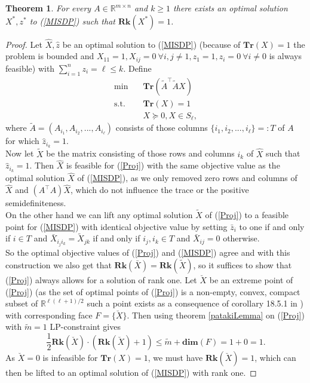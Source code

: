 \documentclass{elsarticle}
\newtheorem{thm}{Theorem}
\newcommand{\T}{^{\top}}
\newcommand{\R}{\mathds{R}}
\begin{document}
\begin{thm}\label{Rk1thm}
 For every $A \in \R^{m \times n}$ and $k \geq 1$ there exists an optimal solution $X^*, z^*$ to (\ref{MISDP}) such that $\textbf{Rk}(X^*) = 1$. 
\end{thm}
\begin{proof}
 Let $\hat{X}, \hat{z}$ be an optimal solution to (\ref{MISDP}) (because of $\textbf{Tr}(X) = 1$ the problem is bounded and $X_{11} = 1, X_{ij} = 0 \ \forall i,j \neq 1, z_1 = 1, z_i = 0 \ \forall i \neq 0$ is always feasible)
 with $\sum_{i=1}^n z_i = \ell \leq k$. Define
 \begin{align}\label{Proj}
 \text{min} \quad & \textbf{Tr}(\tilde{A}\T\tilde{A}X) \nonumber \\
 \text{s.t.} \quad & \textbf{Tr}(X) = 1 \tag{Proj} \\
 & X \succeq 0 , X \in S_\ell, \nonumber
 \end{align}
where $\tilde{A} = (A_{i_1}, A_{i_2}, ..., A_{i_\ell})$ consists of those columns $\{{i_1}, {i_2}, ..., {i_\ell}\} =: T$ of $A$ for which $\hat{z}_{i_k} = 1$. \\
Now let $\tilde{X}$ be the matrix consisting of those rows and columns 
$i_k$ of $\hat{X}$ such that $\hat{z}_{i_k} = 1$. Then $\hat{X}$ is feasible for (\ref{Proj}) with the same objective value as the optimal solution $\hat{X}$ of (\ref{MISDP}), as we only removed zero rows and columns of $\hat{X}$ 
and $(A\T A)\hat{X}$, which do not influence the trace or the positive semidefiniteness. \\
On the other hand we can lift any optimal solution $\tilde{X}$ of (\ref{Proj}) to a feasible point for (\ref{MISDP}) with identical objective value by setting $\bar{z}_i$ to one if and only if $i \in T$
and $\bar{X}_{i_j i_k} = \tilde{X}_{jk}$ if and only if $i_j, i_k \in T$ and $\bar{X}_{ij}=0$ otherwise. \\
So the optimal objective values of (\ref{Proj}) and (\ref{MISDP}) agree and with this construction we also get that 
$\textbf{Rk}(\bar{X}) = \textbf{Rk}(\tilde{X})$, so it suffices to show that (\ref{Proj}) always allows for a solution of rank one.
Let $\breve{X}$ be an extreme point of (\ref{Proj}) (as the set of optimal points of (\ref{Proj}) is a non-empty, convex, compact subset of $\R^{\ell(\ell+1)/2}$ such a point exists as a consequence of corollary 18.5.1 in
\cite{Roc70}) with corresponding face $F=\{\breve{X}\}$. Then using theorem \ref{patakiLemma} on (\ref{Proj}) with $\tilde{m} = 1$ LP-constraint gives
\begin{equation*}
 \frac{1}{2}\textbf{Rk}(\breve{X})\cdot(\textbf{Rk}(\breve{X})+1) \leq \tilde{m} + \textbf{dim}(F) = 1 + 0 = 1.
\end{equation*}
As $\breve{X}=0$ is infeasible for $\textbf{Tr}(X)=1$, we must have $\textbf{Rk}(\breve{X}) = 1$, which can then be lifted to an optimal solution of (\ref{MISDP}) with rank one.
\end{proof}
\end{document}
